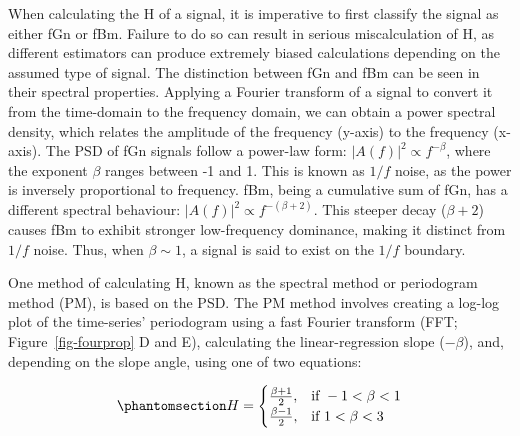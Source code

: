 \documentclass[
  sn-vancouver,
  Numbered,
  referee,
  lineno]{sn-jnl}
\begin{document}
When calculating the H of a signal, it is imperative to first classify
the signal as either fGn or fBm. Failure to do so can result in serious
miscalculation of H, as different estimators can produce extremely
biased calculations depending on the assumed type of signal. The
distinction between fGn and fBm can be seen in their spectral
properties. Applying a Fourier transform of a signal to convert it from
the time-domain to the frequency domain, we can obtain a power spectral
density, which relates the amplitude of the frequency (y-axis) to the
frequency (x-axis). The PSD of fGn signals follow a power-law form:
\(|A(f)|^2 \propto f^{-\beta}\), where the exponent \(\beta\) ranges
between -1 and 1. This is known as \(1/f\) noise, as the power is
inversely proportional to frequency. fBm, being a cumulative sum of fGn,
has a different spectral behaviour:
\(|A(f)|^2 \propto f^{-(\beta + 2)}\). This steeper decay
(\(\beta + 2\)) causes fBm to exhibit stronger low-frequency dominance,
making it distinct from \(1/f\) noise. Thus, when \(\beta \sim 1\), a
signal is said to exist on the \(1/f\) boundary.

One method of calculating H, known as the spectral method or periodogram
method (PM), is based on the PSD. The PM method involves creating a
log-log plot of the time-series' periodogram using a fast Fourier
transform (FFT; Figure~\ref{fig-fourprop} D and E), calculating the
linear-regression slope (\(-\beta\)), and, depending on the slope angle,
using one of two equations:

\begin{equation}\phantomsection\label{eq-psdH}{
H =
\begin{cases}
\frac{\beta + 1}{2}, & \text{if } -1 < \beta < 1 \\
\frac{\beta - 1}{2}, & \text{if } 1 < \beta < 3
\end{cases}
}\end{equation}
\end{document}
